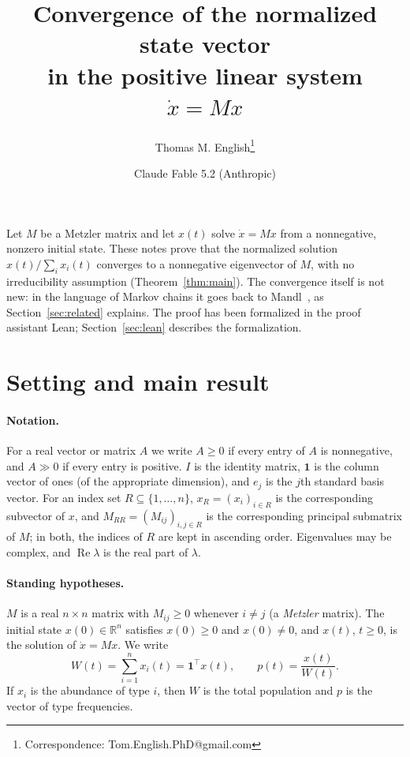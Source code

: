 \documentclass[11pt]{article}
\title{Convergence of the normalized state vector \\ in the positive linear system $\dot{x} = Mx$}
\author{Thomas M. English\footnote{Correspondence: Tom.English.PhD@gmail.com} \and Claude Fable 5.2 (Anthropic)}
\date{}
\theoremstyle{definition}
\theoremstyle{remark}
\newcommand{\R}{\mathbb{R}}
\newcommand{\one}{\mathbf{1}}
\newcommand{\T}{\top}
\renewcommand{\Re}{\operatorname{Re}}
\begin{document}
\maketitle

\noindent
Let $M$ be a Metzler matrix and let $x(t)$ solve $\dot{x} = Mx$ from a nonnegative, nonzero
initial state. These notes prove that the normalized solution $x(t)/\sum_i x_i(t)$ converges to a
nonnegative eigenvector of $M$, with no irreducibility assumption
(Theorem~\ref{thm:main}).
The convergence itself is not new: in the language of Markov chains it goes back to
Mandl~\cite{Mandl59,Mandl60}, as Section~\ref{sec:related} explains.
The proof has been formalized in the proof assistant Lean; Section~\ref{sec:lean} describes the
formalization.

\section{Setting and main result}\label{sec:setting}

\paragraph{Notation.}
For a real vector or matrix $A$ we write $A \ge 0$ if every entry of $A$ is nonnegative, and
$A \gg 0$ if every entry is positive. $I$ is the identity matrix, $\one$ is the column vector of
ones (of the appropriate dimension), and $e_j$ is the $j$th standard basis vector. For an index set $R \subseteq \{1,\dots,n\}$,
$x_R = (x_i)_{i \in R}$ is the corresponding subvector of $x$, and $M_{RR} = (M_{ij})_{i,j \in R}$
is the corresponding principal submatrix of $M$; in both, the indices of $R$ are kept in ascending
order. Eigenvalues may be complex, and $\Re\lambda$ is
the real part of $\lambda$.

\paragraph{Standing hypotheses.}
$M$ is a real $n \times n$ matrix with $M_{ij} \ge 0$ whenever $i \ne j$ (a \emph{Metzler} matrix).
The initial state $x(0) \in \R^n$ satisfies $x(0) \ge 0$ and $x(0) \ne 0$, and $x(t)$, $t \ge 0$,
is the solution of $\dot{x} = Mx$. We write
\[
  W(t) = \sum_{i=1}^n x_i(t) = \one^\T x(t),
  \qquad
  p(t) = \frac{x(t)}{W(t)} .
\]
If $x_i$ is the abundance of type $i$, then $W$ is the total population and $p$ is the vector of
type frequencies.
\end{document}
